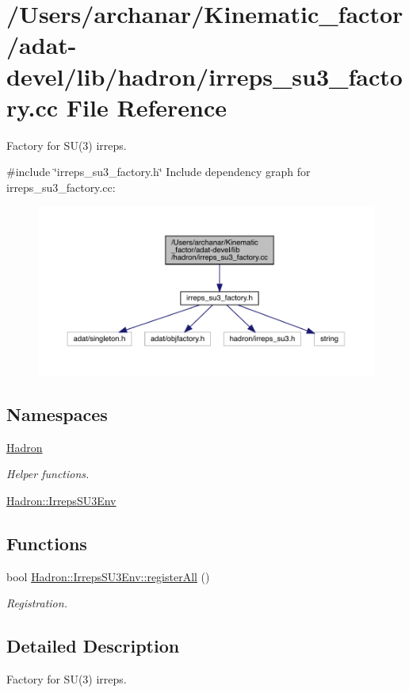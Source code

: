\hypertarget{adat-devel_2lib_2hadron_2irreps__su3__factory_8cc}{}\section{/\+Users/archanar/\+Kinematic\+\_\+factor/adat-\/devel/lib/hadron/irreps\+\_\+su3\+\_\+factory.cc File Reference}
\label{adat-devel_2lib_2hadron_2irreps__su3__factory_8cc}


Factory for S\+U(3) irreps.  


{\ttfamily \#include \char`\"{}irreps\+\_\+su3\+\_\+factory.\+h\char`\"{}}\newline
Include dependency graph for irreps\+\_\+su3\+\_\+factory.\+cc\+:
\nopagebreak
\begin{figure}[H]
\begin{center}
\leavevmode
\includegraphics[width=350pt]{d2/d3d/adat-devel_2lib_2hadron_2irreps__su3__factory_8cc__incl}
\end{center}
\end{figure}
\subsection*{Namespaces}
\begin{DoxyCompactItemize}
\item 
 \mbox{\hyperlink{namespaceHadron}{Hadron}}
\begin{DoxyCompactList}\small\item\em Helper functions. \end{DoxyCompactList}\item 
 \mbox{\hyperlink{namespaceHadron_1_1IrrepsSU3Env}{Hadron\+::\+Irreps\+S\+U3\+Env}}
\end{DoxyCompactItemize}
\subsection*{Functions}
\begin{DoxyCompactItemize}
\item 
bool \mbox{\hyperlink{namespaceHadron_1_1IrrepsSU3Env_a7f85fa639d12623fddad0c09ba7ddef8}{Hadron\+::\+Irreps\+S\+U3\+Env\+::register\+All}} ()
\begin{DoxyCompactList}\small\item\em Registration. \end{DoxyCompactList}\end{DoxyCompactItemize}


\subsection{Detailed Description}
Factory for S\+U(3) irreps. 

